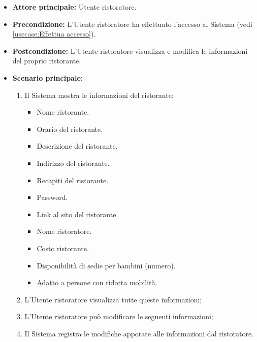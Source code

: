 \label{usecase:Gestione informazioni ristorante}
\begin{itemize}
	\item \textbf{Attore principale:} Utente ristoratore.

	\item \textbf{Precondizione:} L'Utente ristoratore ha effettuato l'accesso al Sistema (vedi \autoref{usecase:Effettua accesso}).

	\item \textbf{Postcondizione:} L'Utente ristoratore visualizza e modifica le informazioni del proprio ristorante.


	\item \textbf{Scenario principale:}
	      \begin{enumerate}

		      \item Il Sistema mostra le informazioni del ristorante:
		      \begin{itemize}
                \item Nome ristorante.
                \item Orario del ristorante.
                \item Descrizione del ristorante.
                \item Indirizzo del ristorante.
                \item Recapiti del ristorante.
                \item Password. 
                \item Link al sito del ristorante.
                \item Nome ristoratore.
                \item Costo ristorante.
                \item Disponibilità di sedie per bambini (numero).
                \item Adatto a persone con ridotta mobilità.
              \end{itemize}

		      \item L'Utente ristoratore visualizza tutte queste informazioni;
		      \item L'Utente ristoratore può modificare le seguenti informazioni;
		      \item Il Sistema registra le modifiche apporate alle informazioni dal ristoratore.

	      \end{enumerate}
\end{itemize}
